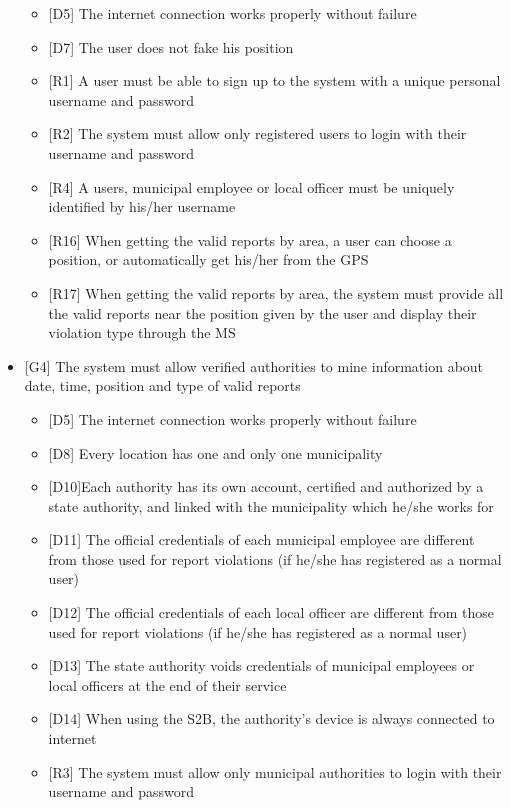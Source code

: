 \begin{itemize}
\begin{itemize}
								\item {[D5]} The internet connection works properly without failure
								\item {[D7]} The user does not fake his position
								\item {[R1]} A user must be able to sign up to the system with a unique personal username and password
								\item {[R2]} The system must allow only registered users to login with their username and password
								\item {[R4]} A users, municipal employee or local officer must be uniquely identified by his/her username
								\item {[R16]} When getting the valid reports by area, a user can choose a position, or automatically get his/her from the GPS
								\item {[R17]} When getting the valid reports by area, the system must provide all the valid reports near the position given by the user and display their violation type through the MS
							\end{itemize}
						\item {[G4]} The system must allow verified authorities to mine information about date, time, position and type of valid reports
							\begin{itemize}
								\item {[D5]} The internet connection works properly without failure
								\item {[D8]} Every location has one and only one municipality
								\item {[D10]}Each authority has its own account, certified and authorized by a state authority, and linked with the municipality which he/she works for
								\item {[D11]} The official credentials of each municipal employee are different from those used for report violations (if he/she has registered as a normal user)
								\item {[D12]} The official credentials of each local officer are different from those used for report violations (if he/she has registered as a normal user)
								\item {[D13]} The state authority voids credentials of municipal employees or local officers at the end of their service
								\item {[D14]} When using the S2B, the authority's device is always connected to internet
								\item {[R3]} The system must allow only municipal authorities to login with their username and password

\end{itemize}
\end{itemize}
